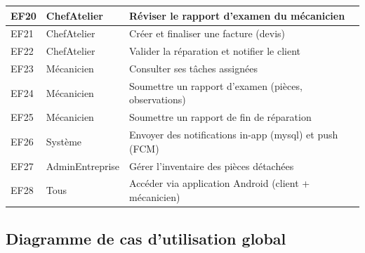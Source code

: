 \documentclass[12pt,a4paper]{report}
\begin{document}
\begin{longtable}{|p{0.5cm}|p{2.5cm}|p{8cm}|}
\hline
EF20 & ChefAtelier & Réviser le rapport d'examen du mécanicien \\
\hline
EF21 & ChefAtelier & Créer et finaliser une facture (devis) \\
\hline
EF22 & ChefAtelier & Valider la réparation et notifier le client \\
\hline
EF23 & Mécanicien & Consulter ses tâches assignées \\
\hline
EF24 & Mécanicien & Soumettre un rapport d'examen (pièces, observations) \\
\hline
EF25 & Mécanicien & Soumettre un rapport de fin de réparation \\
\hline
EF26 & Système & Envoyer des notifications in-app (mysql) et push (FCM) \\
\hline
EF27 & AdminEntreprise & Gérer l'inventaire des pièces détachées \\
\hline
EF28 & Tous & Accéder via application Android (client + mécanicien) \\
\hline
\end{longtable}

\subsection{Diagramme de cas d'utilisation global}
\end{document}

